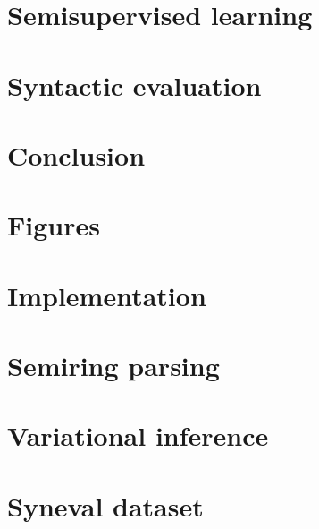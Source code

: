 \documentclass[examplefnt,biber]{../src/nowfnt}
\begin{document}
\chapter{Semisupervised learning}
\label{05-semisupervised}



\chapter{Syntactic evaluation}
\label{06-syneval}



\chapter{Conclusion}
\label{07-conclusion}



\appendix
\chapter{Figures}
\label{A1-figures}



\chapter{Implementation}
\label{A2-implementation}



\chapter{Semiring parsing}
\label{A3-crf}



\chapter{Variational inference}
\label{A4-vi}



\chapter{Syneval dataset}
\label{A5-syneval}



\printbibliography


\backmatter  %
\end{document}
